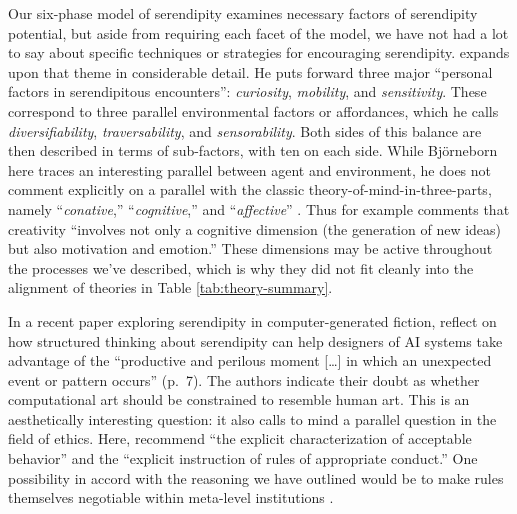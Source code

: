 
Our six-phase model of serendipity examines necessary factors of serendipity
potential, but aside from requiring each facet of the model, we have
not had a lot to say about specific techniques or strategies for
encouraging serendipity.  \citet{bjorneborn2017three} expands upon
that theme in considerable detail.  He puts forward three major
``personal factors in serendipitous encounters'': \emph{curiosity},
\emph{mobility}, and \emph{sensitivity}.  These correspond to three
parallel environmental factors or affordances, which he calls
\emph{diversifiability}, \emph{traversability}, and
\emph{sensorability}.  Both sides of this balance are then described
in terms of sub-factors, with ten on each side.  While Bj\"orneborn
here traces an interesting parallel between agent and environment, he
does not comment explicitly on a parallel with the classic theory-of-mind-in-three-parts, namely ``\emph{conative},''
``\emph{cognitive},'' and ``\emph{affective}''
\cite{hilgard1980trilogy}.
Thus for example \citet[p.~347]{boden1998creativity} comments that
creativity ``involves not only a cognitive dimension (the generation
of new ideas) but also motivation and emotion.''
These dimensions may be active throughout the processes we've
described, which is why they did not fit cleanly into the alignment of
theories in Table \ref{tab:theory-summary}.

In a recent paper exploring serendipity in computer-generated fiction,
\citet{mccallum2018} reflect on how structured thinking about
serendipity can help designers of AI systems take advantage of the
``productive and perilous moment [\ldots] in which an unexpected event
or pattern occurs'' (p.~7).  The authors indicate their doubt as
whether computational art should be constrained to resemble human art.
This is an aesthetically interesting question: it also calls to mind
a parallel question in the field of ethics.
Here, \citet{caliskan2017semantics} recommend ``the explicit
characterization of acceptable behavior'' and the ``explicit
instruction of rules of appropriate conduct.''  One possibility in
accord with the reasoning we have outlined would be to make rules
themselves negotiable within meta-level institutions
\cite{corneli2016institutional}.

